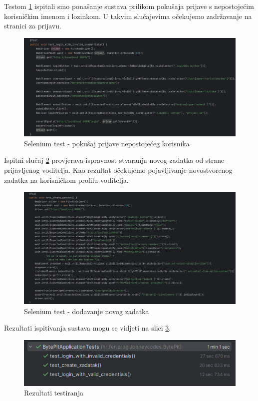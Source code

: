 Testom \ref{fig:selenium2} ispitali smo ponašanje sustava prilikom pokušaja prijave s nepostojećim korisničkim imenom i lozinkom. U takvim slučajevima očekujemo zadržavanje na stranici za prijavu.

\begin{figure}[H]
	\includegraphics[scale=0.14]{slike/selenium_test2.png}
	\centering
	\caption{Selenium test - pokušaj prijave nepostojećeg korisnika}
	\label{fig:selenium2}
\end{figure}
\pagebreak
Ispitni slučaj \ref{fig:selenium3} provjerava ispravnost stvaranja novog zadatka od strane prijavljenog voditelja. Kao rezultat očekujemo pojavljivanje novostvorenog zadatka na korisničkom profilu voditelja.

\begin{figure}[H]
	\includegraphics[scale=0.13]{slike/selenium_test3.png}
	\centering
	\caption{Selenium test - dodavanje novog zadatka}
	\label{fig:selenium3}
\end{figure}

\noindent Rezultati ispitivanja sustava mogu se vidjeti na slici \ref{fig:selenium_rezultati}.

\begin{figure}[H]
	\includegraphics[scale=0.8]{slike/selenium_reultati.png}
	\centering
	\caption{Rezultati testiranja}
	\label{fig:selenium_rezultati}
\end{figure}



